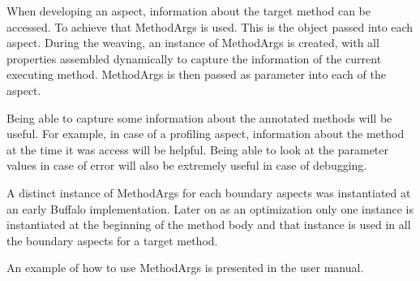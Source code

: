 When developing an aspect, information about the target method can be accessed. To achieve that MethodArgs is used. This is the object passed into each aspect. During the weaving, an instance of MethodArgs is created, with all properties assembled dynamically to capture the information of the current executing method. MethodArgs is then passed as parameter into each of the aspect.

Being able to capture some information about the annotated methods will be useful. For example, in case of a profiling aspect, information about the method at the time it was access will be helpful. Being able to look at the parameter values in case of error will also be extremely useful in case of debugging.

A distinct instance of MethodArgs for each boundary aspects was instantiated at an early Buffalo implementation. Later on as an optimization only one instance is instantiated at the beginning of the method body and that instance is used in all the boundary aspects for a target method.

An example of how to use MethodArgs is presented in the user manual.

